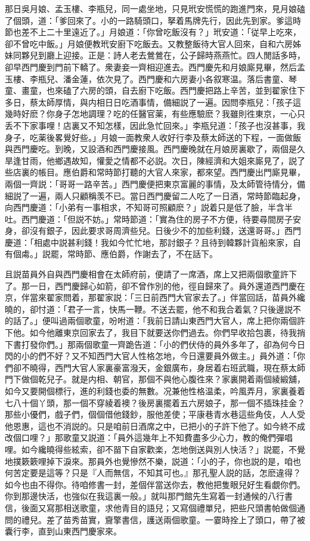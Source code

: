 那日吳月娘、孟玉樓、李瓶兒，同一處坐地，只見玳安慌慌的跑進門來，見月娘磕了個頭，道：「爹回來了。小的一路騎頭口，拏着馬牌先行，因此先到家。爹這時節也差不上二十里遠近了。」月娘道：「你曾吃飯沒有？」玳安道：「従早上吃來，卻不曾吃中飯。」月娘便教玳安廚下吃飯去。又教整飯待大官人回來，自和六房姊妹同夥兒到廳上迎接。正是：詩人老去鶯鶯在，公子歸時燕燕忙。四人閒話多時，卻早西門慶到門前下轎了。衆妻妾一齊相迎進去。西門慶先和月娘廝見畢，然后孟玉樓、李瓶兒、潘金蓮，依次見了。西門慶和六房妻小各叙寒温。落后書童、琴童、畫童，也來磕了六房的頭，自去廚下吃飯。西門慶把路上辛苦，並到翟家住下多日，蔡太師厚情，與内相日日吃酒事情，備細説了一遍。因問李瓶兒：「孩子這幾時好麽？你身子怎地調理？吃的任醫官薬，有些應驗麽？我雖則徃東京，一心只丢不下家事哩！店裏又不知怎樣，因此急忙回來。」李瓶兒道：「孩子也沒甚事，我身子，吃薬後畧覺好些。」月娘一面教衆人收好行李及蔡太師送的下程，一面做飯與西門慶吃。到晚，又設酒和西門慶接風。西門慶晚就在月娘房裏歇了，兩個是久旱逢甘雨，他鄉遇故知，懽愛之情都不必説。次日，陳經濟和大姐來廝見了，説了些店裏的帳目。應伯爵和常時節打聽的大官人來家，都來望。西門慶出門廝見畢，兩個一齊説：「哥哥一路辛苦。」西門慶便把東京富麗的事情，及太師管待情分，備細説了一遍，兩人只顧稱羡不已。當日西門慶留二人吃了一日酒，常時節臨起身，向西門慶道：「小弟有一事相求，不知哥可照顧麽？」説着只是低了臉，半含半吐。西門慶道：「但説不妨。」常時節道：「實為住的房子不方便，待要尋間房子安身，卻沒有銀子，因此要求哥周濟些兒。日後少不的加些利錢，送還哥哥。」西門慶道：「相處中説甚利錢！我如今忙忙地，那討銀子？且待到韓夥計貨船來家，自有個䖏。」説罷，常時節、應伯爵，作謝去了，不在話下。

且説苗員外自與西門慶相會在太師府前，便請了一席酒，席上又把兩個歌童許下了。那一日，西門慶歸心如箭，卻不曾作別的他，徑自歸來了。員外還道西門慶在京，伴當來翟家問着，那翟家説：「三日前西門大官家去了。」伴當回話，苗員外纔曉的，卻忖道：「君子一言，快馬一鞭。不送去罷，他不和我合着氣？只後邊説不的話了。」便叫過兩個歌童，吩咐道：「我前日請山東西門大官人，席上把你兩個許下他。如今他離東京回家去了，我目下就要送你們過去。你們早收拾包裹，待我捎下書打發你們。」那兩個歌童一齊跪告道：「小的們伏侍的員外多年了，卻為何今日閃的小的們不好？又不知西門大官人性格怎地，今日還要員外做主。」員外道：「你們卻不曉得，西門大官人家裏豪富潑天，金銀廣布，身居着右班武職，現在蔡太師門下做個乾兒子。就是内相、朝官，那個不與他心腹徃來？家裏開着兩個綾緞舖，如今又要開個標行，進的利錢也委的無數。况兼他性格温柔，吟風弄月，家裏養着七八十個丫頭，那一個不穿綾着襖？後房裏擺着五六房娘子，那一個不插珠挂金？那些小優們，戲子們，個個借他錢鈔，服他差使；平康巷青水巷這些角伎，人人受他恩惠，這也不消説的。只是咱前日酒席之中，已把小的子許下他了。如今終不成改個口哩？」那歌童又説道：「員外這幾年上不知費盡多少心力，教的俺們彈唱哩。如今纔曉得些絃索，卻不㽞下自家歡楽，怎地倒送與別人快活？」説罷，不覺地撲簌簌哩掉下淚來。那員外也覺慘然不樂，説道：「小的子，你也説的是，咱也何苦定要是這等？只是『人而無信，不知其可也。』那孔聖人説的話，怎麽違得？如今也由不得你。待咱修書一封，差個伴當送你去，教他把隻眼兒好生看覷你們。你到那邊快活，也強似在我這裏一般。」就叫那門館先生寫着一封通候的八行書信，後面又寫那相送歌童，求他青目的語兒；又寫個禮單兒，把些尺頭書帕做個通問的禮兒。差了苗秀苗實，齎擎書信，護送兩個歌童。一霎時拴上了頭口，帶了被囊行李，直到山東西門慶家來。

